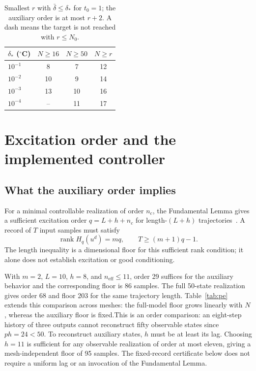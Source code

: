 \documentclass[letterpaper,10pt,conference]{ieeeconf}
\theoremstyle{remark}\newtheorem{remark}{Remark}
\newcommand{\neff}{n_{\mathrm{eff}}}
\begin{document}
\begin{table}[t]\centering
\caption{Smallest $r$ with $\bar\delta\le\delta_*$ for $t_0=1$; the auxiliary order is at most $r+2$. A dash means the target is not reached with $r\le N_0$.}\label{tab:minr}
\begin{tabular}{@{}lccc@{}}\toprule
$\delta_*$ ($^\circ$C)&$N\ge16$&$N\ge50$&$N\ge r$\\\midrule
$10^{-1}$&8&7&12\\
$10^{-2}$&10&9&14\\
$10^{-3}$&13&10&16\\
$10^{-4}$&--&11&17\\\bottomrule
\end{tabular}
\end{table}

\section{Excitation order and the implemented controller}
\subsection{What the auxiliary order implies}
For a minimal controllable realization of order $n_c$, the Fundamental Lemma gives a sufficient excitation order $q=L+h+n_c$ for length-$(L+h)$ trajectories~\cite{willems}. A record of $T$ input samples must satisfy
\begin{equation}\label{eq:pe}
\operatorname{rank}H_q(u^d)=mq,\qquad T\ge(m+1)q-1.
\end{equation}
The length inequality is a dimensional floor for this sufficient rank condition; it alone does not establish excitation or good conditioning.

With $m=2$, $L=10$, $h=8$, and $\neff\le11$, order 29 suffices for the auxiliary behavior and the corresponding floor is 86 samples. The full 50-state realization gives order 68 and floor 203 for the same trajectory length. Table~\ref{tab:pe} extends this comparison across meshes: the full-model floor grows linearly with $N$, whereas the auxiliary floor is fixed.This is an order comparison: an eight-step history of three outputs cannot reconstruct fifty observable states since $ph=24<50$. To reconstruct auxiliary states, $h$ must be at least its lag. Choosing $h=11$ is sufficient for any observable realization of order at most eleven, giving a mesh-independent floor of 95 samples. The fixed-record certificate below does not require a uniform lag or an invocation of the Fundamental Lemma.
\end{document}
